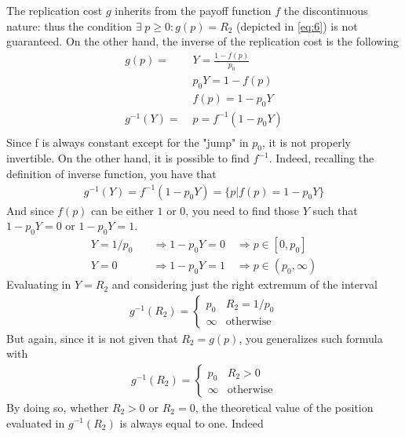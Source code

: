\documentclass[12pt]{article}
\begin{document}
\newline\newline
The replication cost $g$ inherits from the payoff function $f$ the discontinuous nature: thus the condition $\exists\; p\geq 0 : g(p)=R_2$ (depicted in \eqref{eq:6}) is not guaranteed.
On the other hand, the inverse of the replication cost is the following
\begin{align*}
    g(p) = \;      & Y = \frac{1-f(p)}{p_0} \\
                   & p_0Y = 1-f(p)          \\
                   & f(p) = 1-p_0Y          \\
    g^{-1}(Y) = \; & p = f^{-1}(1-p_0Y)     \\
\end{align*}
Since f is always constant except for the "jump" in $p_0$, it is not properly invertible. On the other hand, it is possible to find $f^{-1}$. Indeed, recalling the definition of inverse function, you have that
\begin{align*}
    g^{-1}(Y)=f^{-1}(1-p_0Y)=\{p| f(p)=1-p_0Y    \}
\end{align*}
And since $f(p)$ can be either $1$ or $0$, you need to find those $Y$ such that $1-p_0Y=0$ or $1-p_0Y=1$.
\begin{align*}
    Y=1/p_0 & \quad \Rightarrow 1-p_0Y=0  \quad \Rightarrow p\in[0,p_0]       \\
    Y=0     & \quad \Rightarrow 1-p_0Y=1  \quad \Rightarrow  p\in(p_0,\infty)
\end{align*}
Evaluating in $Y=R_2$ and considering just the right extremum of the interval
\begin{align*}
    g^{-1}(R_2) = \begin{cases}
                      p_0    & R_2= 1/p_0       \\
                      \infty & \text{otherwise}
                  \end{cases}
\end{align*}
But again, since it is not given that $R_2 = g(p)$, you generalizes such formula with
\begin{align*}
    g^{-1}(R_2) = \begin{cases}
                      p_0    & R_2>0            \\
                      \infty & \text{otherwise}
                  \end{cases}
\end{align*}
By doing so, whether $R_2>0$ or $R_2=0$, the theoretical value of the position evaluated in $g^{-1}(R_2)$ is always equal to one. Indeed
\end{document}
